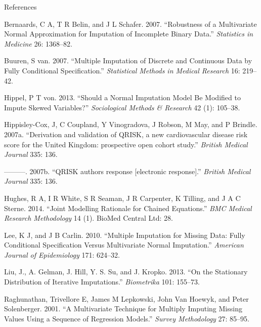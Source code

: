 \documentclass[ignorenonframetext,]{beamer}
\begin{document}
\begin{frame}[allowframebreaks]{References}
\protect\hypertarget{references}{}

\hypertarget{refs}{}
\leavevmode\hypertarget{ref-Bernaardsux2fBelin:2007}{}%
Bernaards, C A, T R Belin, and J L Schafer. 2007. ``Robustness of a
Multivariate Normal Approximation for Imputation of Incomplete Binary
Data.'' \emph{Statistics in Medicine} 26: 1368--82.

\leavevmode\hypertarget{ref-Buuren:2007}{}%
Buuren, S van. 2007. ``Multiple Imputation of Discrete and Continuous
Data by Fully Conditional Specification.'' \emph{Statistical Methods in
Medical Research} 16: 219--42.

\leavevmode\hypertarget{ref-vonHippel2013}{}%
Hippel, P T von. 2013. ``Should a Normal Imputation Model Be Modified to
Impute Skewed Variables?'' \emph{Sociological Methods \& Research} 42
(1): 105--38.

\leavevmode\hypertarget{ref-Hippisley-Cox2007}{}%
Hippisley-Cox, J, C Coupland, Y Vinogradova, J Robson, M May, and P
Brindle. 2007a. ``Derivation and validation of QRISK, a new
cardiovascular disease risk score for the United Kingdom: prospective
open cohort study.'' \emph{British Medical Journal} 335: 136.

\leavevmode\hypertarget{ref-Hippisley-Cox2007a}{}%
---------. 2007b. ``QRISK authors response {[}electronic response{]}.''
\emph{British Medical Journal} 335: 136.

\leavevmode\hypertarget{ref-Hughes2014}{}%
Hughes, R A, I R White, S R Seaman, J R Carpenter, K Tilling, and J A C
Sterne. 2014. ``Joint Modelling Rationale for Chained Equations.''
\emph{BMC Medical Research Methodology} 14 (1). BioMed Central Ltd: 28.

\leavevmode\hypertarget{ref-Leeux2fCarlin:2010}{}%
Lee, K J, and J B Carlin. 2010. ``Multiple Imputation for Missing Data:
Fully Conditional Specification Versus Multivariate Normal Imputation.''
\emph{American Journal of Epidemiology} 171: 624--32.

\leavevmode\hypertarget{ref-Liu2013}{}%
Liu, J., A. Gelman, J. Hill, Y. S. Su, and J. Kropko. 2013. ``On the
Stationary Distribution of Iterative Imputations.'' \emph{Biometrika}
101: 155--73.

\leavevmode\hypertarget{ref-Raghunathanux2fLepkowskiux2fVan-Hoewykux2fSolenberger:2001}{}%
Raghunathan, Trivellore E, James M Lepkowski, John Van Hoewyk, and Peter
Solenberger. 2001. ``A Multivariate Technique for Multiply Imputing
Missing Values Using a Sequence of Regression Models.'' \emph{Survey
Methodology} 27: 85--95.


\end{frame}
\end{document}
